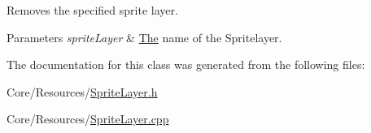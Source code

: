 Removes the specified sprite layer. 


\begin{DoxyParams}{Parameters}
{\em sprite\-Layer} & \hyperlink{classThe}{The} name of the Spritelayer. \\
\hline
\end{DoxyParams}


The documentation for this class was generated from the following files\-:\begin{DoxyCompactItemize}
\item 
Core/\-Resources/\hyperlink{SpriteLayer_8h}{Sprite\-Layer.\-h}\item 
Core/\-Resources/\hyperlink{SpriteLayer_8cpp}{Sprite\-Layer.\-cpp}\end{DoxyCompactItemize}
